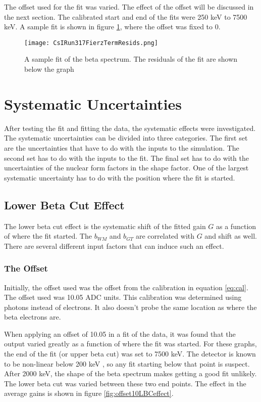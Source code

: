 \documentclass[../MaxHughesThesis.tex]{subfiles}
\begin{document}
The offset used for the fit was varied.
The effect of the offset will be discussed in the next section. 
The calibrated start and end of the fits were 250 keV to 7500 keV. 
A sample fit is shown in figure \ref{fig:samplefit}, where the offset was fixed to 0.

\begin{figure}[!htb]
	\centerline{\texttt{[image: CsIRun317FierzTermResids.png]}}
	\caption{A sample fit of the beta spectrum. 
		 The residuals of the fit are shown below the graph}
	\label{fig:samplefit}
\end{figure}

\section{Systematic Uncertainties}

After testing the fit and fitting the data, the systematic effects were investigated.
The systematic uncertainties can be divided into three categories.
The first set are the uncertainties that have to do with the inputs to the simulation.
The second set has to do with the inputs to the fit.
The final set has to do with the uncertainties of the nuclear form factors in the shape factor. 
One of the largest systematic uncertainty has to do with the position where the fit is started. 

\subsection{Lower Beta Cut Effect}

The lower beta cut effect is the systematic shift of the fitted gain $G$ as a function of where the fit started.
The $b_{WM}$ and $b_{GT}$ are correlated with $G$ and shift as well.
There are several different input factors that can induce such an effect.

\subsubsection{The Offset}
Initially, the offset used was the offset from the calibration in equation \ref{eq:cal}.
The offset used was 10.05 ADC units.
This calibration was determined using photons instead of electrons.
It also doesn't probe the same location as where the beta electrons are.

When applying an offset of 10.05 in a fit of the data, it was found that the output varied greatly as a function of where the fit was started.
For these graphs, the end of the fit (or upper beta cut) was set to 7500 keV.
The detector is known to be non-linear below 200 keV \cite{Kno10}, so any fit starting below that point is suspect. 
After 2000 keV, the shape of the beta spectrum makes getting a good fit unlikely.
The lower beta cut was varied between these two end points.
The effect in the average gains is shown in figure \ref{fig:offset10LBCeffect}.
\end{document}

